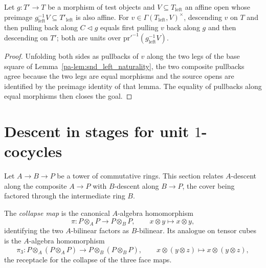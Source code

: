 \begin{theorem}
  \label{pa-thm:unitsSndEquiv_naturality}
  \leanok

  Let \(g \colon T' \to T\) be a morphism of test objects and \(V \subseteq T_{\mathrm{left}}\)
  an affine open whose preimage \(g_{\mathrm{left}}^{-1} V \subseteq T'_{\mathrm{left}}\) is also
  affine.  For \(v \in \Gamma(T_{\mathrm{left}}, V)^{\times}\), descending \(v\) on \(T\) and
  then pulling back along \(C \lhd g\) equals first pulling \(v\) back along \(g\) and then
  descending on \(T'\); both are units over \(\mathrm{pr}'^{-1}(g_{\mathrm{left}}^{-1} V)\).
\end{theorem}
\begin{proof}
  \leanok
  Unfolding both sides as pullbacks of \(v\) along the two legs of the base square of
  Lemma~\ref{pa-lem:snd_left_naturality}, the two composite pullbacks agree because the two legs are
  equal morphisms and the source opens are identified by the preimage identity of that lemma.
  The equality of pullbacks along equal morphisms then closes the goal.
\end{proof}

\section{Descent in stages for unit \(1\)-cocycles}
\label{pa-sec:unitDescentComposite}

Let \(A \to B \to P\) be a tower of commutative rings.  This section relates \(A\)-descent
along the composite \(A \to P\) with \(B\)-descent along \(B \to P\), the cover being factored
through the intermediate ring \(B\).

\begin{definition}
  \label{pa-def:module_tensorCollapse}
  \leanok

  The \emph{collapse map} is the canonical \(A\)-algebra homomorphism
  \[
    \pi \colon P \otimes_A P \longrightarrow P \otimes_B P, \qquad x \otimes y \mapsto x \otimes
    y,
  \]
  identifying the two \(A\)-bilinear factors as \(B\)-bilinear.  Its analogue on tensor cubes is
  the \(A\)-algebra homomorphism
  \[
    \pi_3 \colon P \otimes_A (P \otimes_A P) \longrightarrow P \otimes_B (P \otimes_B P), \qquad
    x \otimes (y \otimes z) \mapsto x \otimes (y \otimes z),
  \]
  the receptacle for the collapse of the three face maps.
\end{definition}

